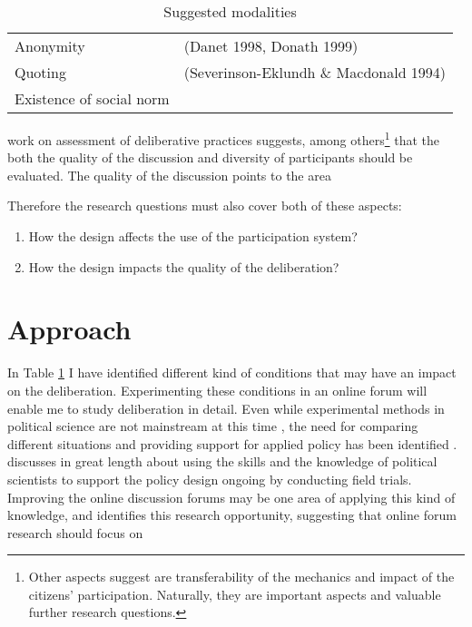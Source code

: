 \documentclass[journal,a4paper]{IEEEtran}
\begin{document}
\begin{table}
\caption{Suggested modalities}
\begin{tabular}{ll}
Anonymity & (Danet 1998, Donath 1999)  \\ 
Quoting & (Severinson-Eklundh \& Macdonald 1994) \\ 
Existence of social norm & \cite{sukumaran11} \\
\end{tabular} 
\label{tab:modalities}
\end{table}

 work on assessment of deliberative practices suggests, among others\footnote{Other aspects  suggest are transferability of the mechanics and impact of the citizens' participation. Naturally, they are important aspects and valuable further research questions.} that the both the quality of the discussion and diversity of participants should be evaluated. The quality of the discussion points to the area

Therefore the research questions must also cover both of these aspects:

\begin{enumerate}
\item How the design affects the use of the participation system?
\item How the design impacts the quality of the deliberation?
\end{enumerate}

\section{Approach}

In Table \ref{tab:modalities} I have identified different kind of conditions that may have an impact on the deliberation. Experimenting these conditions in an online forum will enable me to study deliberation in detail. Even while experimental methods in political science are not mainstream at this time \cite{green03,druckman06}, the need for comparing different situations and providing support for applied policy has been identified \cite{stoker10}.  discusses in great length about using the skills and the knowledge of political scientists to support the policy design ongoing by conducting field trials. Improving the online discussion forums may be one area of applying this kind of knowledge, and  identifies this research opportunity, suggesting that online forum research should focus on
\end{document}
